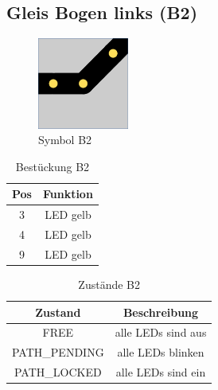 \documentclass[10pt,a4paper]{article}
\begin{document}
\subsection{Gleis Bogen links (B2)}
\begin{figure}[hbtp]
\centering
\includegraphics[width=3cm]{../folien/b2.png}
\caption{Symbol B2}
\end{figure}
\begin{table}[h!]
\centering
\begin{tabular}{c|c}
\textbf{Pos} & \textbf{Funktion} \\ \hline
3 & LED gelb \\
4 & LED gelb \\
9 & LED gelb
\end{tabular}
\caption{Bestückung B2}
\end{table}
\begin{table}[h!]
\centering
\begin{tabular}{c|c}
\textbf{Zustand} & \textbf{Beschreibung} \\ \hline
FREE & alle LEDs sind aus \\
PATH\_PENDING & alle LEDs blinken \\
PATH\_LOCKED & alle LEDs sind ein
\end{tabular}
\caption{Zustände B2}
\end{table}

\newpage
\end{document}
